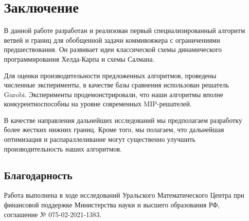 \section{Заключение}\label{sec:summary}

В данной работе
разработан и реализован
первый специализированный алгоритм
ветвей и границ
для обобщенной задачи коммивояжера
с ограничениями предшествования.
Он развивает идеи классической схемы
динамического программирования
Хелда-Карпа
и схемы Салмана.

Для оценки производительности
предложенных алгоритмов,
проведены численные эксперименты,
в качестве базы сравнения использован
решатель Gurobi.
Эксперименты продемонстрировали,
что наши алгоритмы
вполне конкурентноспособны на уровне
современных MIP-решателей.

В качестве направления дальнейших исследований
мы предполагаем разработку более
жестких нижних границ.
Кроме того,
мы полагаем,
что дальнейшая оптимизация
и распараллеливание
могут существенно улучшить производительность
наших алгоритмов.

\subsection*{Благодарность}

Работа выполнена
в ходе исследований
Уральского Математического Центра
при финансовой поддержке Министерства науки и высшего образования РФ,
соглашение № 075-02-2021-1383.
